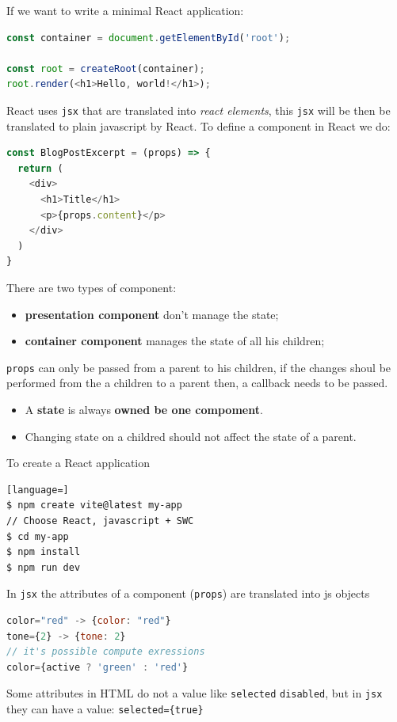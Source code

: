 \documentclass[12pt]{article}
\begin{document}
If we want to write a minimal React application:
\begin{lstlisting}[language=js]
const container = document.getElementById('root');

const root = createRoot(container);
root.render(<h1>Hello, world!</h1>);
\end{lstlisting}
React uses \texttt{jsx} that are translated into \emph{react elements}, this \texttt{jsx} will be then be translated to plain javascript by React. To define a component in React we do:
\begin{lstlisting}[language=js]
const BlogPostExcerpt = (props) => {
  return (
    <div>
      <h1>Title</h1>
      <p>{props.content}</p>
    </div>
  )
}
\end{lstlisting}
There are two types of component: 
\begin{itemize}
  \item \textbf{presentation component} don't manage the state;
  \item \textbf{container component} manages the state of all his children;
\end{itemize}
\texttt{props} can only be passed from a parent to his children, if the changes shoul be performed from the a children to a parent then, a callback needs to be passed.
\begin{center}
\end{center}
\begin{itemize}
  \item A \textbf{state} is always \textbf{owned be one compoment}.
  \item Changing state on a childred should not affect the state of a parent.
\end{itemize}
To create a React application
\begin{lstlisting}[language=]
$ npm create vite@latest my-app
// Choose React, javascript + SWC
$ cd my-app
$ npm install
$ npm run dev
\end{lstlisting}
In \texttt{jsx} the attributes of a component (\texttt{props}) are translated into js objects
\begin{lstlisting}[language=js]
color="red" -> {color: "red"}
tone={2} -> {tone: 2}
// it's possible compute exressions
color={active ? 'green' : 'red'}
\end{lstlisting}
Some attributes in HTML do not a value like \texttt{selected} \texttt{disabled}, but in \texttt{jsx} they can have a value: \verb|selected={true}|
\end{document}
